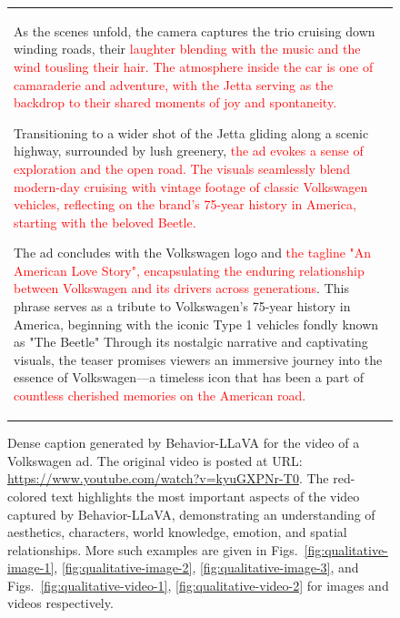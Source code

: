 \begin{landscape}
\begin{figure}[t]
\begin{minipage}[c]{0.73\textwidth}
\begin{tabular}{p{14cm}}
As the scenes unfold, the camera captures the trio cruising down winding roads, their \textcolor{red}{laughter blending with the music and the wind tousling their hair. The atmosphere inside the car is one of camaraderie and adventure, with the Jetta serving as the backdrop to their shared moments of joy and spontaneity.}

Transitioning to a wider shot of the Jetta gliding along a scenic highway, surrounded by lush greenery, \textcolor{red}{the ad evokes a sense of exploration and the open road. The visuals seamlessly blend modern-day cruising with vintage footage of classic Volkswagen vehicles, reflecting on the brand's 75-year history in America, starting with the beloved Beetle.}

The ad concludes with the Volkswagen logo and \textcolor{red}{the tagline  "An American Love Story", encapsulating the enduring relationship between Volkswagen and its drivers across generations}. This phrase serves as a tribute to Volkswagen's 75-year history in America, beginning with the iconic Type 1 vehicles fondly known as "The Beetle" Through its nostalgic narrative and captivating visuals, the teaser promises viewers an immersive journey into the essence of Volkswagen—a timeless icon that has been a part of \textcolor{red}{countless cherished memories on the American road.}
\end{tabular}
\end{minipage}
\caption{Dense caption generated by Behavior-LLaVA for the video of a Volkswagen ad. The original video is posted at URL: \url{https://www.youtube.com/watch?v=kyuGXPNr-T0}. The red-colored text highlights the most important aspects of the video captured by Behavior-LLaVA, demonstrating an understanding of aesthetics, characters, world knowledge, emotion, and spatial relationships. More such examples are given in Figs.~\ref{fig:qualitative-image-1}, \ref{fig:qualitative-image-2}, \ref{fig:qualitative-image-3}, and Figs.~\ref{fig:qualitative-video-1}, \ref{fig:qualitative-video-2} for images and videos respectively. \label{fig:qualitative-video-3}}
\end{figure}








\end{landscape}
